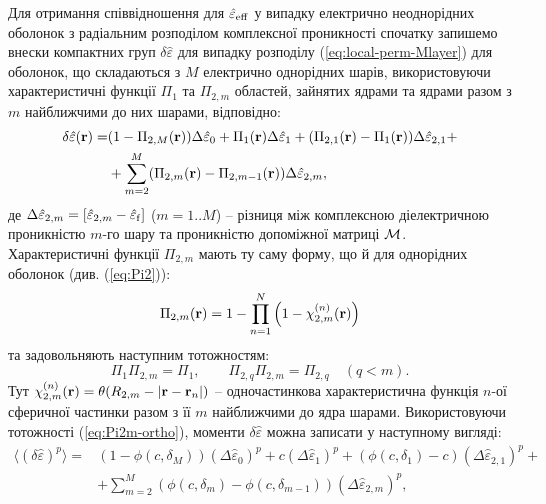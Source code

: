 \documentclass[14pt,twoside]{vakthesis}
\begin{document}
Для отримання співвідношення для $\hat{\varepsilon}_{\rm eff}$ у випадку електрично неоднорідних оболонок з радіальним розподілом комплексної проникності спочатку запишемо внески компактних груп $\delta\hat{\varepsilon}$ для випадку розподілу (\ref{eq:local-perm-Mlayer}) для оболонок, що складаються з $M$ електрично однорідних  шарів, використовуючи характеристичні функції $\Pi_1$ та $\Pi_{2,m}$ областей, зайнятих ядрами та ядрами разом з $m$ найближчими до них шарами, відповідно:
\begin{equation}\label{eq:delta-eps-Mlayers}
\begin{split}
\delta\hat{\varepsilon} ({\bf r}) =& (1 - \Pi_{2,M} ({\bf r})) \Delta\hat{\varepsilon}_0
+ \Pi_1 ({\bf r}) \Delta\hat{\varepsilon}_1
+ (\Pi_{2,1} ({\bf r}) - \Pi_{1} ({\bf r})) \Delta\hat{\varepsilon}_{2,1} +\\
&+ \sum\limits_{m=2}^M (\Pi_{2,m} ({\bf r}) - \Pi_{2,m-1} ({\bf r})) \Delta\hat{\varepsilon}_{2,m},
\end{split}
\end{equation}
де $\Delta\hat{\varepsilon}_{2,m} = [\hat{\varepsilon}_{2,m} - \hat{\varepsilon}_{\rm f}]$ ($m=1..M$) -- різниця між комплексною діелектричною проникністю $m$-го шару та проникністю допоміжної матриці $\cal M$. Характеристичні функції $\Pi_{2,m}$ мають ту саму форму, що й для однорідних оболонок (див. (\ref{eq:Pi2})):
\begin{equation}\label{eq:Pi2m}
\Pi_{2,m} ({\bf r}) = 1 - \prod\limits_{n=1}^N \left( 1 - \chi_{2,m}^{(n)} ({\bf r}) \right)
\end{equation}
та задовольняють наступним тотожностям:
\begin{equation}\label{eq:Pi2m-ortho}
	\Pi_1 \Pi_{2,m}  = \Pi_1,\qquad
	\Pi_{2,q} \Pi_{2,m} = \Pi_{2,q} \quad(q<m).
\end{equation}
Тут $\chi_{2,m}^{(n)} ({\bf r}) = \theta(R_{2,m} - |{\bf r} - {\bf r}_n|)$ -- одночастинкова характеристична функція $n$-ої сферичної частинки разом з її $m$ найближчими до ядра шарами.
Використовуючи тотожності (\ref{eq:Pi2m-ortho}), моменти $\delta\hat{\varepsilon}$ можна записати у наступному вигляді:
\begin{equation}\label{eq:moment-Mlayer}
\begin{split}
\langle (\delta\hat{\varepsilon})^p \rangle =& 
(1 - \phi(c,\delta_M)) (\Delta\hat{\varepsilon}_0)^p + 
c (\Delta\hat{\varepsilon}_1)^p + (\phi(c,\delta_1) - c) (\Delta\hat{\varepsilon}_{2,1})^p + \\
&+\sum\limits_{m=2}^M (\phi(c,\delta_m) - \phi(c,\delta_{m-1})) (\Delta\hat{\varepsilon}_{2,m})^p,
\end{split}
\end{equation}
\end{document}

